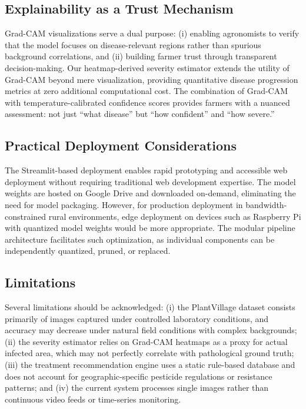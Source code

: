 \documentclass[conference]{IEEEtran}
\begin{document}
\subsection{Explainability as a Trust Mechanism}
Grad-CAM visualizations serve a dual purpose: (i) enabling agronomists to verify that the model focuses on disease-relevant regions rather than spurious background correlations, and (ii) building farmer trust through transparent decision-making. Our heatmap-derived severity estimator extends the utility of Grad-CAM beyond mere visualization, providing quantitative disease progression metrics at zero additional computational cost. The combination of Grad-CAM with temperature-calibrated confidence scores provides farmers with a nuanced assessment: not just ``what disease'' but ``how confident'' and ``how severe.''

\subsection{Practical Deployment Considerations}
The Streamlit-based deployment enables rapid prototyping and accessible web deployment without requiring traditional web development expertise. The model weights are hosted on Google Drive and downloaded on-demand, eliminating the need for model packaging. However, for production deployment in bandwidth-constrained rural environments, edge deployment on devices such as Raspberry Pi with quantized model weights would be more appropriate. The modular pipeline architecture facilitates such optimization, as individual components can be independently quantized, pruned, or replaced.

\subsection{Limitations}
Several limitations should be acknowledged: (i) the PlantVillage dataset consists primarily of images captured under controlled laboratory conditions, and accuracy may decrease under natural field conditions with complex backgrounds; (ii) the severity estimator relies on Grad-CAM heatmaps as a proxy for actual infected area, which may not perfectly correlate with pathological ground truth; (iii) the treatment recommendation engine uses a static rule-based database and does not account for geographic-specific pesticide regulations or resistance patterns; and (iv) the current system processes single images rather than continuous video feeds or time-series monitoring.
\end{document}
